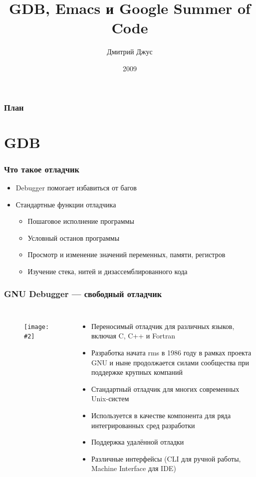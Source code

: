 \documentclass[onlymath]{beamer}
\title{GDB, Emacs и Google Summer of Code }
\author{Дмитрий Джус}
\institute{МГТУ им. Н.Э.Баумана}
\date{2009}
\newcommand{\cenfig}[2]{\begin{figure}\centering\texttt{[image: \#2]}
  \end{figure}}
\begin{document}
\begin{frame}
  \titlepage
\end{frame}

\begin{frame}
  \frametitle{План}
  \tableofcontents
\end{frame}

\section{GDB}

\begin{frame}
  \frametitle{Что такое отладчик}
  \begin{itemize}
  \item Debugger помогает избавиться от багов
  \item Стандартные функции отладчика
    \begin{itemize}
    \item Пошаговое исполнение программы
    \item Условный останов программы
    \item Просмотр и изменение значений переменных, памяти,
      регистров
    \item Изучение стека, нитей и дизассемблированного кода
    \end{itemize}
  \end{itemize}
\end{frame}

\begin{frame}
  \frametitle{GNU Debugger — свободный отладчик}
  \begin{columns}
    \cenfig{0.5}{archer.jpg}

  \begin{itemize}
  \item Переносимый отладчик для различных языков, включая C, C++ и Fortran
  \item Разработка начата rms в 1986 году в рамках проекта GNU и ныне
    продолжается силами сообщества при поддержке крупных компаний
  \item Стандартный отладчик для многих современных Unix-систем
  \item Используется в качестве компонента для ряда интегрированных
    сред разработки
  \item Поддержка удалённой отладки
  \item Различные интерфейсы (CLI для ручной работы, Machine Interface
    для IDE)
  \end{itemize}
\end{columns}
\end{frame}
\end{document}
